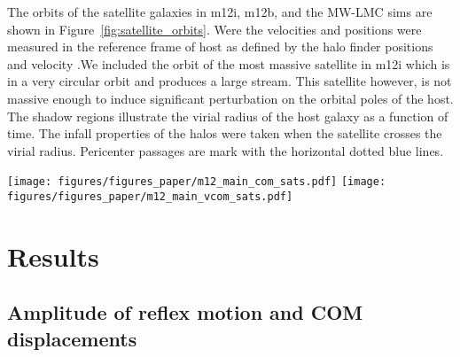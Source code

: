 \documentclass{aastex63}
\begin{document}
The orbits of the satellite galaxies in m12i, m12b, and the MW-LMC sims are shown in Figure~\ref{fig:satellite_orbits}. Were the velocities and positions were measured in the reference frame of host as defined by the halo finder positions and velocity .We included the orbit of the most massive satellite in m12i which is in a very circular orbit and produces a large stream. This satellite however, is not massive enough to induce significant perturbation on the orbital poles of the host. The shadow regions illustrate the virial radius of the host galaxy as a function of time. The infall properties of the halos were taken when the satellite crosses the virial radius. Pericenter passages are mark with the horizontal dotted blue lines. 

\begin{figure*}
    \centering
    \texttt{[image: figures/figures\_paper/m12\_main\_com\_sats.pdf]}
    \texttt{[image: figures/figures\_paper/m12\_main\_vcom\_sats.pdf]}

    \caption{Satellite's galactocentric position (top panel) and velocity (middle panel) as a function of time. The magnitude of the host's velocity plotted as a function of time. The host's velocity decreases by 60km/s after the satellite's first pericenter, and then increase 80km/s until the 2nd pericenter. Finally the velocity settles after the merger at 140 km/s. Such rapid motions happen in less than 2 Gyrs. (How does it compare with the dynamical times of the halo). Satellite's galactocentric position (top panel) and velocity (middle panel) as a function of time. The magnitude of the host's velocity plotted as a function of time. The host's velocity decreases by 60km/s after the satellite's first pericenter, and then increase 80km/s until the 2nd pericenter. Finally the velocity settles after the merger at 140 km/s. Such rapid motions happen in less than 2 Gyrs. (How does it compare with the dynamical times of the halo). }
    \label{fig:satellite_orbits}
\end{figure*}
  

\section{Results}


\subsection{Amplitude of reflex motion and COM displacements}\label{sec:reflex}
\end{document}
